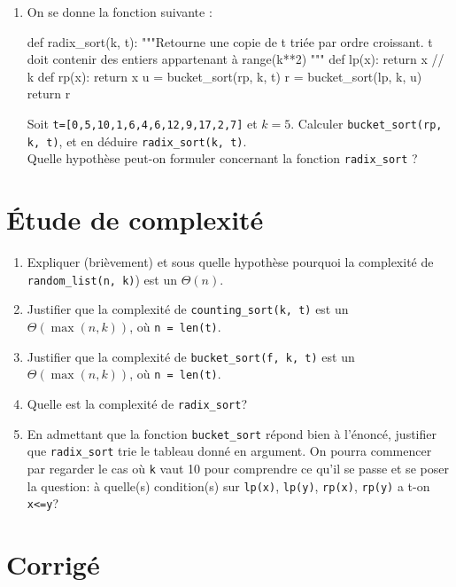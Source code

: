 \begin{enumerate}
\item On se donne la fonction suivante :\\

\begin{python}
def radix_sort(k, t):
    """Retourne une copie de t triée par ordre croissant.
    t doit contenir des entiers appartenant à range(k**2)
    """
    def lp(x):
        return x // k
    def rp(x):
        return x %
    u = bucket_sort(rp, k, t)
    r = bucket_sort(lp, k, u)
    return r
\end{python}

Soit \texttt{t=[0,5,10,1,6,4,6,12,9,17,2,7]} et $k=5$. Calculer \texttt{bucket\_sort(rp, k, t)}, et en déduire 
\texttt{radix\_sort(k, t)}.\\
Quelle hypothèse peut-on formuler concernant la fonction \texttt{radix\_sort} ?

  \setcounter{saveenum}{\value{enumi}}
\end{enumerate}

\section{Étude de complexité}

\begin{enumerate}
 \setcounter{enumi}{\value{saveenum}}
\item  Expliquer (brièvement)  et  sous quelle  hypothèse pourquoi  la
  complexité de \texttt{random\_list(n, k)}) est un $\Theta(n)$.
\item Justifier que la complexité de \texttt{counting\_sort(k, t)} est un
  $\Theta(\max(n, k))$, où \texttt{n = len(t)}.
\item Justifier que la complexité de \texttt{bucket\_sort(f, k, t)} est un
  $\Theta(\max(n, k))$, où \texttt{n = len(t)}.
\item Quelle est la complexité de \texttt{radix\_sort}?
\item 
En admettant que la fonction \texttt{bucket\_sort} répond bien à l'énoncé,
justifier que \texttt{radix\_sort} trie le tableau donné en argument. On
pourra commencer par regarder le cas où \texttt{k} vaut 10 pour comprendre
ce qu'il se passe et se poser la question: à quelle(s) condition(s)
sur \texttt{lp(x)}, \texttt{lp(y)}, \texttt{rp(x)}, \texttt{rp(y)} a t-on \texttt{x<=y}?
\end{enumerate}

\fi

\ifprof
\section*{Corrigé }

